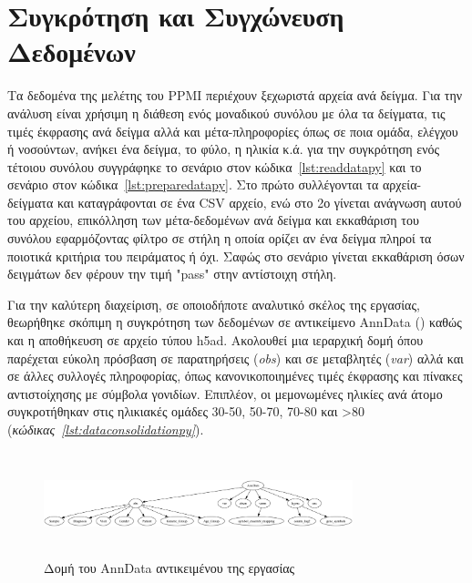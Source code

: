 \documentclass[12pt]{report}
\begin{document}
    \section{Συγκρότηση και Συγχώνευση Δεδομένων}
        \par
            Τα δεδομένα της μελέτης του PPMI περιέχουν ξεχωριστά αρχεία ανά δείγμα. Για την ανάλυση είναι χρήσιμη η διάθεση ενός μοναδικού συνόλου με όλα τα δείγματα, τις τιμές έκφρασης ανά δείγμα αλλά και μέτα-πληροφορίες όπως σε ποια ομάδα, ελέγχου ή νοσούντων, ανήκει ένα δείγμα, το φύλο, η ηλικία κ.ά. για την συγκρότηση ενός τέτοιου συνόλου συγγράφηκε το σενάριο στον κώδικα~\ref{lst:readdatapy} και το σενάριο στον κώδικα~\ref{lst:preparedatapy}. Στο πρώτο συλλέγονται τα αρχεία-δείγματα και καταγράφονται σε ένα CSV αρχείο, ενώ στο 2ο γίνεται ανάγνωση αυτού του αρχείου, επικόλληση των μέτα-δεδομένων ανά δείγμα και εκκαθάριση του συνόλου εφαρμόζοντας φίλτρο σε στήλη η οποία ορίζει αν ένα δείγμα πληροί τα ποιοτικά κριτήρια του πειράματος ή όχι. Σαφώς στο σενάριο γίνεται εκκαθάριση όσων δειγμάτων δεν φέρουν την τιμή "pass" στην αντίστοιχη στήλη.
        \par
            Για την καλύτερη διαχείριση, σε οποιοδήποτε αναλυτικό σκέλος της εργασίας, θεωρήθηκε σκόπιμη η συγκρότηση των δεδομένων σε αντικείμενο AnnData (\emph{\cite{Virshup2024Anndata:Matrices}}) καθώς και η αποθήκευση σε αρχείο τύπου h5ad. Ακολουθεί μια ιεραρχική δομή όπου παρέχεται εύκολη πρόσβαση σε παρατηρήσεις (\emph{obs}) και σε μεταβλητές (\emph{var}) αλλά και σε άλλες συλλογές πληροφορίας, όπως κανονικοποιημένες τιμές έκφρασης και πίνακες αντιστοίχησης με σύμβολα γονιδίων. Επιπλέον, οι μεμονωμένες ηλικίες ανά άτομο συγκροτήθηκαν στις ηλικιακές ομάδες 30-50, 50-70, 70-80 και >80 (\emph{κώδικας~\ref{lst:dataconsolidationpy}}).
            \begin{figure}[h]
                \centering
                \includegraphics[width=0.8\textwidth,height=3.0cm]{anndata_structure.png}
                \caption{Δομή του AnnData αντικειμένου της εργασίας}
                \label{fig:figure-1}
            \end{figure}
\end{document}

